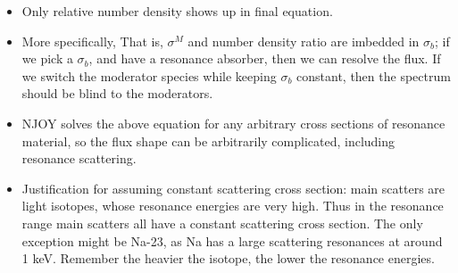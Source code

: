 \documentclass{school-22.211-notes}
\begin{document}
\begin{itemize}
\item Only relative number density shows up in final equation.

\item More specifically,  That is, $\sigma^M$ and number density ratio are imbedded in $\sigma_b$; if we pick a $\sigma_b$, and have a resonance absorber, then we can resolve the flux. If we switch the moderator species while keeping $\sigma_b$ constant, then the spectrum should be blind to the moderators. 

\item NJOY solves the above equation for any arbitrary cross sections of resonance material, so the flux shape can be arbitrarily complicated, including resonance scattering. 

\item Justification for assuming constant scattering cross section: main scatters are light isotopes, whose resonance energies are very high. Thus in the resonance range main scatters all have a constant scattering cross section. The only exception might be Na-23, as Na has a large scattering resonances at around 1 keV. Remember the heavier the isotope, the lower the resonance energies. 
\end{itemize}
\end{document}

